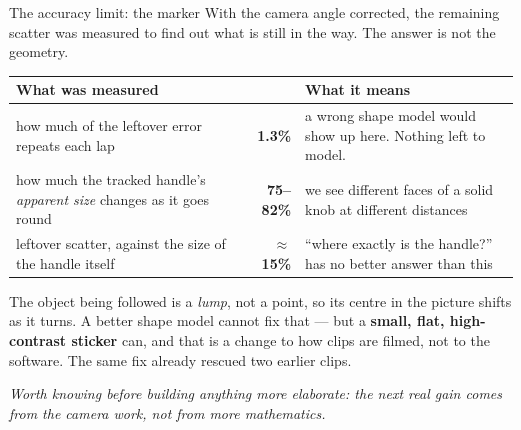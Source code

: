 \documentclass[aspectratio=169,10pt]{beamer}
\newcommand{\takeaway}[1]{\vfill{\footnotesize\itshape\color{cGrey}#1\par}}
\begin{document}
\begin{frame}{The accuracy limit: the marker}
\small
With the camera angle corrected, the remaining scatter was measured to find out what is still in
the way. The answer is not the geometry.
\vspace{0.4em}
\scriptsize
\renewcommand{\arraystretch}{1.4}
\begin{tabular}{@{}p{6.4cm}rp{5.6cm}@{}}
\toprule
\textbf{What was measured} & & \textbf{What it means} \\
\midrule
how much of the leftover error repeats each lap &
\textbf{1.3\%} & a wrong shape model would show up here. Nothing left to model. \\
how much the tracked handle's \emph{apparent size} changes as it goes round &
\textbf{75--82\%} & we see different faces of a solid knob at different distances \\
leftover scatter, against the size of the handle itself &
\textbf{$\approx$15\%} & ``where exactly is the handle?'' has no better answer than this \\
\bottomrule
\end{tabular}
\vspace{0.5em}

\small The object being followed is a \emph{lump}, not a point, so its centre in the picture shifts
as it turns. A better shape model cannot fix that --- but a \textbf{small, flat, high-contrast
sticker} can, and that is a change to how clips are filmed, not to the software. The same fix
already rescued two earlier clips.
\takeaway{Worth knowing before building anything more elaborate: the next real gain comes from the
camera work, not from more mathematics.}
\end{frame}
\end{document}
